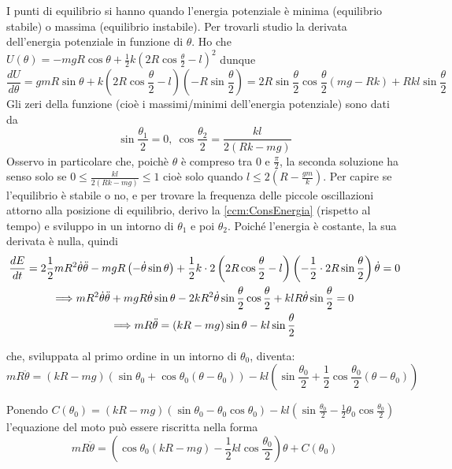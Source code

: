 \documentclass[../main.tex]{subfiles}
\begin{document}
I punti di equilibrio si hanno quando l'energia potenziale è minima (equilibrio stabile) o massima (equilibrio instabile). Per trovarli studio la derivata dell'energia potenziale in funzione di $\theta$. Ho che $U(\theta) =  - mgR\cos\theta + \frac{1}{2}k\left ( 2R\cos\frac{\theta}{2} - l\right ) ^2$ dunque
\begin{equation*}
	\frac{dU}{d\theta} = gmR\sin\theta + k\left ( 2R\cos\frac{\theta}{2} - l\right )\left (-R\sin\frac{\theta}{2}\right ) = 2R\sin\frac{\theta}{2}\cos\frac{\theta}{2} \left (mg - Rk \right ) + Rkl\sin\frac{\theta}{2}
\end{equation*}
Gli zeri della funzione (cioè i massimi/minimi dell'energia potenziale) sono dati da $$\sin\frac{\theta_1}{2} = 0,\  \cos\frac{\theta_2}{2}=\frac{kl}{2\left ( Rk - mg\right )}$$
Osservo in particolare che, poichè $\theta$ è compreso tra $0$ e $\frac{\pi}{2}$, la seconda soluzione ha senso solo se $0 \le \frac{kl}{2\left ( Rk - mg\right )} \le 1$ cioè solo quando $l\le2\left ( R - \frac{gm}{k}\right )$.
Per capire se l'equilibrio è stabile o no, e per trovare la frequenza delle piccole oscillazioni attorno alla posizione di equilibrio, derivo la \cref{ccm:ConsEnergia} (rispetto al tempo) e sviluppo in un intorno di $\theta_1$ e poi $\theta_2$. Poiché l'energia è costante, la sua derivata è nulla, quindi 
\begin{gather}
	\frac{dE}{dt}=2 \frac{1}{2}mR^2\dot\theta\ddot\theta-mgR\left (-\dot\theta\sin\theta\right ) + \frac{1}{2}k\cdot 2\left (2R\cos\frac{\theta}{2}-l\right ) \left ( -\frac{1}{2}\cdot 2R\sin\frac{\theta}{2}\right )\dot\theta = 0 \notag \\
	\Longrightarrow mR^2\dot\theta\ddot\theta+mgR\dot\theta\sin\theta-2kR^2\dot\theta\sin\frac{\theta}{2}\cos\frac{\theta}{2}+klR\dot\theta\sin\frac{\theta}{2}=0 \notag\\
	\Longrightarrow mR\ddot\theta = \left ( kR - mg \right )\sin\theta - kl\sin\frac{\theta}{2} \label{ccm:EqMotoGiusta}
\end{gather}

che, sviluppata al primo ordine in un intorno di $\theta_0$, diventa:
\begin{equation}
	mR\ddot\theta = \left ( kR - mg \right ) \left ( \sin\theta_0 + \cos\theta_0\left ( \theta - \theta_0 \right ) \right ) - kl \left ( \sin\frac{\theta_0}{2} + \frac{1}{2}\cos\frac{\theta_0}{2}\left ( \theta - \theta_0 \right ) \right )
\end{equation}

Ponendo $C(\theta_0) = \left ( kR - mg \right ) \left ( \sin\theta_0 - \theta_0\cos\theta_0\right ) - kl\left (\sin\frac{\theta_0}{2} - \frac{1}{2}\theta_0\cos\frac{\theta_0}{2}\right )$ l'equazione del moto può essere riscritta nella forma
\begin{equation}\label{ccm:EqApprossimata}
	mR\ddot\theta = \left ( \cos\theta_0\left (kR-mg\right ) -\frac{1}{2}kl\cos\frac{\theta_0}{2}\right ) \theta + C(\theta_0)
\end{equation}
\end{document}
